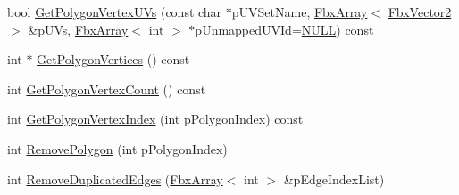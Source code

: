 \begin{DoxyCompactItemize}
\item 
bool \hyperlink{class_fbx_mesh_afb155cdf892fb81276718913eae02e85}{Get\+Polygon\+Vertex\+U\+Vs} (const char $\ast$p\+U\+V\+Set\+Name, \hyperlink{class_fbx_array}{Fbx\+Array}$<$ \hyperlink{class_fbx_vector2}{Fbx\+Vector2} $>$ \&p\+U\+Vs, \hyperlink{class_fbx_array}{Fbx\+Array}$<$ int $>$ $\ast$p\+Unmapped\+U\+V\+Id=\hyperlink{fbxarch_8h_a070d2ce7b6bb7e5c05602aa8c308d0c4}{N\+U\+LL}) const
\item 
int $\ast$ \hyperlink{class_fbx_mesh_a0c29a17dfc1db3644772acb5c32a63b0}{Get\+Polygon\+Vertices} () const
\item 
int \hyperlink{class_fbx_mesh_a46cdb95dfe5052564aeeba288474076e}{Get\+Polygon\+Vertex\+Count} () const
\item 
int \hyperlink{class_fbx_mesh_a942e182a7c27fa11464b9adb0c9cdc3b}{Get\+Polygon\+Vertex\+Index} (int p\+Polygon\+Index) const
\item 
int \hyperlink{class_fbx_mesh_aad5e2768669d5c94e8d96d7d65fcab68}{Remove\+Polygon} (int p\+Polygon\+Index)
\item 
int \hyperlink{class_fbx_mesh_a5e7104d87f03542c0fc040ae1f7f593d}{Remove\+Duplicated\+Edges} (\hyperlink{class_fbx_array}{Fbx\+Array}$<$ int $>$ \&p\+Edge\+Index\+List)
\end{DoxyCompactItemize}
